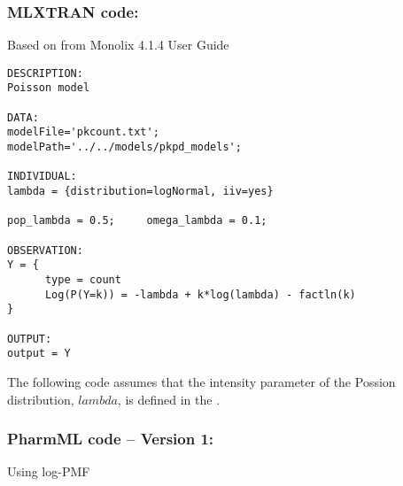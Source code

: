 \myEndLine

\subsubsection{MLXTRAN code:}
Based on from Monolix 4.1.4 User Guide \cite{Monolix4.1.4UserGuide:2012}

\myStartLine

\lstset{language=MLXTRANcode}
\begin{lstlisting}
DESCRIPTION:
Poisson model

DATA:
modelFile='pkcount.txt';
modelPath='../../models/pkpd_models';

INDIVIDUAL:
lambda = {distribution=logNormal, iiv=yes}

pop_lambda = 0.5;     omega_lambda = 0.1;

OBSERVATION:
Y = {
      type = count
      Log(P(Y=k)) = -lambda + k*log(lambda) - factln(k)
}

OUTPUT: 
output = Y
\end{lstlisting}

\myEndLine


The following code assumes that the intensity parameter of the Possion distribution, $lambda$, 
is defined in the .

\subsubsection{PharmML code -- Version 1:}
Using log-PMF

